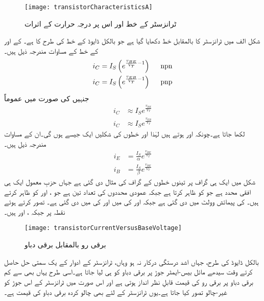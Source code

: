 \begin{figure}
\centering
\texttt{[image: transistorCharacteristicsA]}
\caption{ٹرانزسٹر کے خط اور اس پر درجہ حرارت کے اثرات}
\label{شکل_ٹرانزسٹر_کے_خط_بالمقابل_حرارت}
\end{figure}
%
شکل  الف میں  ٹرانزسٹر کا  بالمقابل  خط دکھایا گیا ہے جو بالکل ڈایوڈ کے خط کی طرح کا ہے۔ کے  اور  کے  خط کے مساوات مندرجہ ذیل ہیں۔
\begin{align}\label{مساوات_ٹرانزسٹر_کی_بنیادی_مساوات}
i_C&=I_S \left (e^{\frac{v_{BE}}{V_T}-1} \right ) \hspace{5mm} \textrm{npn}\\
i_C&=I_S \left (e^{\frac{v_{EB}}{V_T}-1} \right) \hspace{5mm} \textrm{pnp}
\end{align}
جنہیں  کی صورت میں عموماً
\begin{align}
i_C& \approx I_S e^{\frac{v_{BE}}{V_T}}\\
i_C& \approx I_S e^{\frac{v_{EB}}{V_T}}
\end{align}
لکھا جاتا ہے۔چونکہ   اور   ہوتے ہیں لہٰذا  اور   خطوں کی شکلیں ایک جیسے ہوں گی۔ان کے مساوات مندرجہ ذیل ہیں۔
\begin{align}
i_E&=\frac{I_S}{\alpha} e^{\frac{v_{BE}}{V_T}}\\
i_B&=\frac{I_S}{\beta} e^{\frac{v_{BE}}{V_T}}
\end{align}
شکل   میں ایک ہی گراف پر تینوں خطوں کے گراف کی مثال دی گئی ہے جہاں حزبِ معمول ایک ہی افقی محدد ہے جو  کو ظاہر کرتا ہے جبکہ عمودی محددوں کی تعداد تین ہے جو  ، اور  کو ظاہر کرتے ہیں۔  کی پیمائش وولٹ   میں دی گئی ہے جبکہ   اور   کی   میں اور   کی   میں دی گئی ہے۔   تصور کرتے ہوئے  نقطہ  پر  جبکہ   ،  اور  ہیں۔
\begin{figure}
\centering
\texttt{[image: transistorCurrentVersusBaseVoltage]}
\caption{برقی رو بالمقابل برقی دباو}
\label{شکل_برقی_رو_بالمقابل_برقی_دباو}
\end{figure}
بالکل ڈایوڈ کی طرح، جہاں اشد درستگی درکار نہ ہو وہاں، ٹرانزسٹر کے ادوار کے یک سمتی حل حاصل کرتے وقت سیدھے مائل بیس-ایمٹر  جوڑ پر برقی دباو   کو  ہی لیا جاتا ہے۔اسی طرح یہاں بھی   سے کم برقی دباو پر برقی رو   کی قیمت قابلِ نظر انداز ہوتی ہے اور اس صورت میں ٹرانزسٹر کے اس جوڑ کو غیر-چالو تصور کیا جاتا ہے۔یوں ٹرانزسٹر کے لئے بھی چالو کردہ برقی دباو  کی قیمت  ہے۔


